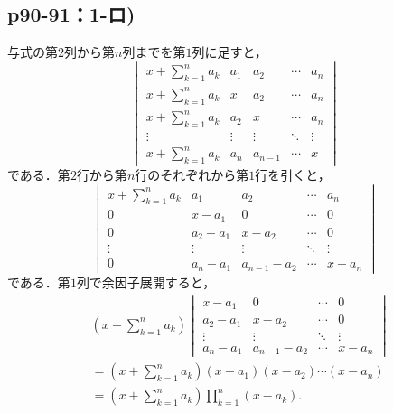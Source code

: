 \documentclass[uplatex,dvipdfmx,a4paper,11pt,fleqn]{jsarticle}
\begin{document}
\subsection*{p90-91：1-ロ)}

\begin{tleftbar}
    与式の第$2$列から第$n$列までを第$1$列に足すと，
    \[
        \begin{vmatrix} 
            x+\sum_{k=1}^{n} a_k & a_1 & a_2 & \cdots & a_n \\
            x+\sum_{k=1}^{n} a_k & x & a_2 & \cdots & a_n \\
            x+\sum_{k=1}^{n} a_k & a_2 & x &\cdots & a_n \\
            \vdots & \vdots & \vdots & \ddots & \vdots \\
            x+\sum_{k=1}^{n} a_k & a_n & a_{n-1} & \cdots & x
        \end{vmatrix}
    \]
    である．第$2$行から第$n$行のそれぞれから第$1$行を引くと，
    \[
        \begin{vmatrix} 
            x+\sum_{k=1}^{n} a_k & a_1 & a_2 & \cdots & a_n \\
            0 & x-a_1 & 0 & \cdots & 0 \\
            0 & a_2 -a_1 & x-a_2 &\cdots & 0 \\
            \vdots & \vdots & \vdots & \ddots & \vdots \\
            0 & a_n-a_1 & a_{n-1}-a_2 & \cdots & x-a_n 
        \end{vmatrix}
    \]
    である．第$1$列で余因子展開すると，
    \begin{align*} 
        & 
        (x+\sum_{k=1}^{n} a_k)
        \begin{vmatrix} 
            x-a_1 & 0 & \cdots & 0 \\
            a_2 -a_1 & x-a_2 &\cdots & 0 \\
            \vdots & \vdots & \ddots & \vdots \\
            a_n-a_1 & a_{n-1}-a_2 & \cdots & x-a_n 
        \end{vmatrix}
        \\
        & = (x+\sum_{k=1}^{n} a_k) (x-a_1)(x-a_2) \dotsm (x-a_n) \\
        & = (x+\sum_{k=1}^{n} a_k) \prod_{k=1}^{n} (x-a_k).
    \end{align*}
    \end{tleftbar}
\end{document}
